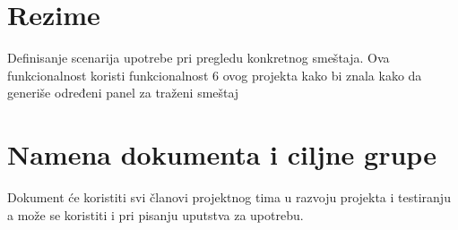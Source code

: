 \section{Rezime}
Definisanje scenarija upotrebe pri pregledu konkretnog smeštaja. Ova funkcionalnost koristi funkcionalnost 6 ovog projekta kako bi znala kako da generiše određeni panel za traženi smeštaj
\section{Namena dokumenta i ciljne grupe}
Dokument će koristiti svi članovi projektnog tima u razvoju projekta i testiranju a može se koristiti i pri pisanju uputstva za upotrebu.